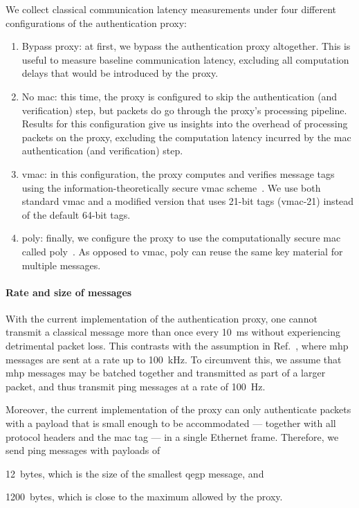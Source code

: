We collect classical communication latency measurements under four different configurations of the
authentication proxy:

\begin{enumerate}
    \item Bypass proxy: at first, we bypass the authentication proxy altogether. This is useful to
          measure baseline communication latency, excluding all computation delays that would be
          introduced by the proxy.
    \item No \acrshort{mac}: this time, the proxy is configured to skip the authentication (and
          verification) step, but packets do go through the proxy's processing pipeline. Results for
          this configuration give us insights into the overhead of processing packets on the proxy,
          excluding the computation latency incurred by the \acrshort{mac} authentication (and
          verification) step.
    \item \acrshort{vmac}: in this configuration, the proxy computes and verifies message tags using
          the information-theoretically secure \acrshort{vmac} scheme~\cite{krovetz_2007_message}.
          We use both standard \acrshort{vmac} and a modified version that uses 21-bit tags
          (\acrshort{vmac}-21) instead of the default 64-bit tags.
    \item \acrshort{poly}: finally, we configure the proxy to use the computationally secure
          \acrshort{mac} called \acrshort{poly}~\cite{bernstein_2005_poly1305}. As opposed to
          \acrshort{vmac}, \acrshort{poly} can reuse the same key material for multiple messages.
\end{enumerate}

\paragraph{Rate and size of messages}

With the current implementation of the authentication proxy, one cannot transmit a classical message
more than once every \qty{10}{\ms} without experiencing detrimental packet loss. This contrasts with
the assumption in Ref.~\cite{dahlberg_2019_egp}, where \acrshort{mhp} messages are sent at a rate up
to \qty{100}{\kHz}. To circumvent this, we assume that \acrshort{mhp} messages may be batched
together and transmitted as part of a larger packet, and thus transmit ping messages at a rate of
\qty{100}{\Hz}.

Moreover, the current implementation of the proxy can only authenticate packets with a payload that
is small enough to be accommodated --- together with all protocol headers and the \acrshort{mac} tag
--- in a single Ethernet frame. Therefore, we send ping messages with payloads of
%
\begin{inlinelist}
    \item \num{12}~bytes, which is the size of the smallest \acrshort{qegp} message, and
    \item \num{1200}~bytes, which is close to the maximum allowed by the proxy.
\end{inlinelist}

